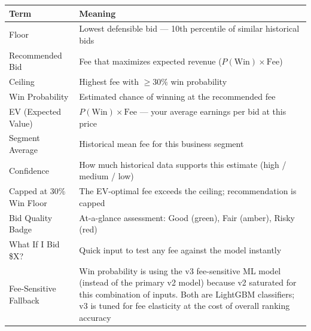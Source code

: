 \documentclass[12pt,a4paper]{article}
\begin{document}
\begin{tabularx}{\textwidth}{l >{\raggedright\arraybackslash}X}
    \toprule
    \textbf{Term} & \textbf{Meaning} \\
    \midrule
    Floor & Lowest defensible bid --- 10th percentile of similar historical bids \\[0.3em]
    Recommended Bid & Fee that maximizes expected revenue ($P(\text{Win}) \times \text{Fee}$) \\[0.3em]
    Ceiling & Highest fee with $\geq 30\%$ win probability \\[0.3em]
    Win Probability & Estimated chance of winning at the recommended fee \\[0.3em]
    EV (Expected Value) & $P(\text{Win}) \times \text{Fee}$ --- your average earnings per bid at this price \\[0.3em]
    Segment Average & Historical mean fee for this business segment \\[0.3em]
    Confidence & How much historical data supports this estimate (high / medium / low) \\[0.3em]
    Capped at 30\% Win Floor & The EV-optimal fee exceeds the ceiling; recommendation is capped \\[0.3em]
    Bid Quality Badge & At-a-glance assessment: Good (green), Fair (amber), Risky (red) \\[0.3em]
    What If I Bid \$X? & Quick input to test any fee against the model instantly \\[0.3em]
    Fee-Sensitive Fallback & Win probability is using the v3 fee-sensitive ML model (instead of the primary v2 model) because v2 saturated for this combination of inputs. Both are LightGBM classifiers; v3 is tuned for fee elasticity at the cost of overall ranking accuracy \\
    \bottomrule
\end{tabularx}
\end{document}
